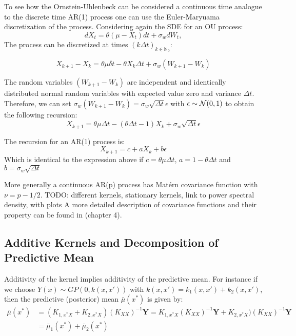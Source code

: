 To see how the Ornstein-Uhlenbeck can be considered a continuous time analogue to the discrete time
AR(1) process one can use the Euler-Maryuama discretization of the process.
Considering again the SDE for an OU process:
$$dX_t = \theta (\mu - X_t)dt + \sigma_w dW_t,$$
The process can be discretized at times $(k \Delta t)_{k \in \mathbb{N}_0}$:

$$ X_{k+1} - X_k = \theta \mu \delta t - \theta X_k \Delta t + \sigma_w (W_{k+1} - W_k)$$

The random variables $(W_{k+1} - W_k)$ are independent and identically distributed normal random variables
with expected value zero and variance $\Delta t$.
Therefore, we can set $\sigma_w (W_{k+1} - W_k) = \sigma_w \sqrt{\Delta t} \epsilon$ with $\epsilon \sim \operatorname{\mathcal{N}}(0,1)$
to obtain the following recursion:
$$ X_{k+1} = \theta \mu \Delta t - (\theta \Delta t - 1) X_k + \sigma_w \sqrt{\Delta t} \epsilon$$

The recursion for an AR(1) process is:
$$ X_{k+1} = c + a X_k + b \epsilon$$
Which is identical to the expression above if $c= \theta \mu \Delta t$, $a=1- \theta \Delta t$ and
$b= \sigma_w \sqrt{\Delta t}$



More generally a continuous AR(p) process has Matérn covariance function with $\nu = p - 1/2$.
TODO: different kernels, stationary kernels, link to power spectral density, with plots
A more detailed description of covariance functions and their property can be found
in \citeauthor{rasmussen_gaussian_2006} (chapter 4).



\subsection{Additive Kernels and Decomposition of Predictive Mean}

Additivity of the kernel implies additivity of the predictive mean.
For instance if we choose $Y(x) \sim GP(0, k(x,x'))$ with $k(x,x') = k_1(x, x') + k_2(x,x')$, then
the predictive (posterior) mean $\bar{\mu}(x^{\ast})$
is given by:
\begin{align*}
    \bar{\mu}(x^{\ast}) &= (K_{1, x^{\ast}X} + K_{2, x^{\ast}X}) (K_{XX})^{-1} \mathbf{Y}
    = K_{1, x^{\ast}X} (K_{XX})^{-1} \mathbf{Y} + K_{2, x^{\ast}X}) (K_{XX})^{-1} \mathbf{Y} \\
    &= \bar{\mu}_1(x^{\ast}) + \bar{\mu}_2(x^{\ast})
\end{align*}


